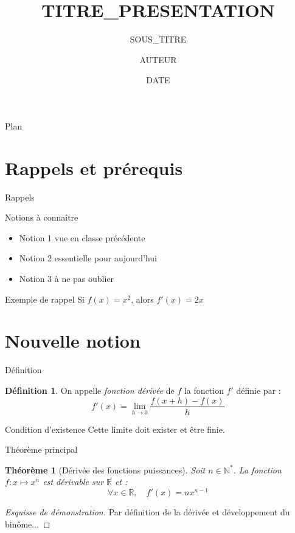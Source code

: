 \documentclass[12pt, xcolor={svgnames}]{beamer}
\title{{{TITRE_PRESENTATION}}}
\subtitle{{{SOUS_TITRE}}}
\author{{{AUTEUR}}}
\date{{{DATE}}}
\institute{{{ETABLISSEMENT}}}
\newtheorem{theoreme}{Théorème}
\theoremstyle{definition}
\newtheorem{definition}{Définition}
\begin{document}
\begin{frame}
  \titlepage
\end{frame}

\begin{frame}{Plan}
  \tableofcontents
\end{frame}

\section{Rappels et prérequis}

\begin{frame}{Rappels}
  \begin{block}{Notions à connaître}
    \begin{itemize}
      \item Notion 1 vue en classe précédente
      \item Notion 2 essentielle pour aujourd'hui
      \item Notion 3 à ne pas oublier
    \end{itemize}
  \end{block}

  \pause

  \begin{exampleblock}{Exemple de rappel}
    Si $f(x) = x^2$, alors $f'(x) = 2x$
  \end{exampleblock}
\end{frame}

\section{Nouvelle notion}

\begin{frame}{Définition}
  \begin{definition}
    On appelle \emph{fonction dérivée} de $f$ la fonction $f'$ définie par :
    \[
      f'(x) = \lim_{h \to 0} \frac{f(x+h) - f(x)}{h}
    \]
  \end{definition}

  \pause

  \begin{alertblock}{Condition d'existence}
    Cette limite doit exister et être finie.
  \end{alertblock}
\end{frame}

\begin{frame}{Théorème principal}
  \begin{theoreme}[Dérivée des fonctions puissances]
    Soit $n \in \mathbb{N}^*$. La fonction $f : x \mapsto x^n$ est dérivable sur $\mathbb{R}$ et :
    \[
      \forall x \in \mathbb{R}, \quad f'(x) = nx^{n-1}
    \]
  \end{theoreme}

  \pause

  \begin{proof}[Esquisse de démonstration]
    Par définition de la dérivée et développement du binôme...
  \end{proof}
\end{frame}
\end{document}
